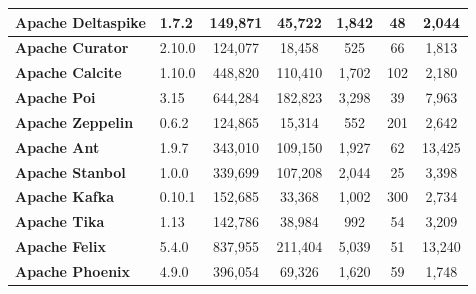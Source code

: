 \begin{landscape}
\begin{table}[htbp]
\begin{adjustbox}{width=1.3\textwidth}
\begin{tabular}{l|l|c|c|c|c|c}
			\textbf{Apache Deltaspike} & 1.7.2            &          149,871           &           45,722           &       1,842        &           48           &        2,044         \\ \hline
			\textbf{Apache Curator}    & 2.10.0           &          124,077           &           18,458           &        525        &           66           &        1,813         \\ \hline
			\textbf{Apache Calcite}    & 1.10.0           &          448,820           &          110,410           &       1,702        &          102           &        2,180         \\ \hline
			\textbf{Apache Poi}        & 3.15             &          644,284           &          182,823           &       3,298        &           39           &        7,963         \\ \hline
			\textbf{Apache Zeppelin}   & 0.6.2            &          124,865           &           15,314           &        552        &          201           &        2,642         \\ \hline
			\textbf{Apache Ant}        & 1.9.7            &          343,010           &          109,150           &       1,927        &           62           &        13,425        \\ \hline
			\textbf{Apache Stanbol}    & 1.0.0            &          339,699           &          107,208           &       2,044        &           25           &        3,398         \\ \hline
			\textbf{Apache Kafka}      & 0.10.1           &          152,685           &           33,368           &       1,002        &          300           &        2,734         \\ \hline
			\textbf{Apache Tika}       & 1.13             &          142,786           &           38,984           &        992        &           54           &        3,209         \\ \hline
			\textbf{Apache Felix}      & ‎5.4.0           &          837,955           &          211,404           &       5,039        &           51           &        13,240        \\ \hline
			\textbf{Apache Phoenix}    & 4.9.0            &          396,054           &           69,326           &       1,620        &           59           &        1,748         \\ \hline
		\end{tabular}
		\label{table:ch4_projects_statistics}

\end{adjustbox}

\end{table}

\end{landscape}



